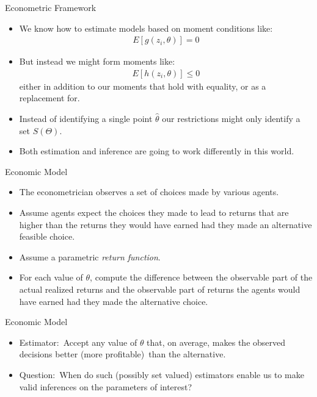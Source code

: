 \begin{frame}{Econometric Framework}
\begin{itemize}
\item We know how to estimate models based on moment conditions like:
\begin{eqnarray*}
E[g(z_i, \theta)] = 0
\end{eqnarray*}
\item But instead we might form moments like:
\begin{eqnarray*}
E[h(z_i, \theta)] \leq 0
\end{eqnarray*}
either in addition to our moments that hold with equality, or as a replacement for.
\item Instead of identifying a single point $\hat{\theta}$ our restrictions might only \alert{identify a set} $S(\Theta)$.
\item Both estimation and inference are going to work differently in this world.
\end{itemize}
\end{frame}


\begin{frame}{Economic Model}
\begin{itemize}
\item The econometrician observes a set of choices made by various agents.
\vspace{0.1in}
\item Assume agents expect the choices they made to lead to returns that are
higher than the returns they would have earned had they made an
alternative feasible choice.
\vspace{0.1in}
\item Assume a parametric \textit{return function}.
\vspace{0.1in}
\item For each value of $\theta $, compute the difference between the observable part of the actual realized returns and the observable part of returns the agents would have earned had they made the alternative choice.
\end{itemize}
\end{frame}


\begin{frame}{Economic Model}
\begin{itemize}
\item Estimator:\ Accept any value of $\theta $ that, on average, makes the
observed decisions better (more profitable)\ than the alternative.
\vspace{0.1in}
\item Question:\ When do such (possibly set valued) estimators enable us to
make valid inferences on the parameters of interest?
\end{itemize}
\end{frame}


